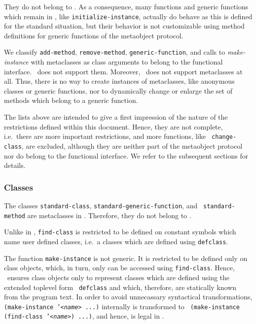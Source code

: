 They do not belong to . 
As a consequence, many functions and generic functions which remain in
, like {\tt initialize-instance},
actually do behave as this is defined for the standard
situation, but their behavior is not customizable using method
definitions for generic functions of the metaobject protocol. 

We classify {\tt add-method}, {\tt remove-method}, {\tt generic-function}, and calls to 
{\em make-instance} with metaclasses
as class arguments to belong to the functional interface. \ does not 
support them. Moreover, \ does not support metaclasses at all.
Thus, there is no way to create instances of metaclasses, like anonymous classes or generic 
functions, nor to dynamically change or enlarge the set of methods which 
belong to a generic function.

The lists above are intended to give a first impression of the 
nature of 
the restrictions defined within this document. Hence, they are not complete, 
i.e.\ there are more important restrictions, and more functions, like {\tt 
change-class}, are excluded, although they are neither part of the metaobject 
protocol nor do belong to the functional interface.
We refer to the subsequent sections for details.

\subsubsection{Classes}
\label{classes}

The classes {\tt standard-class}, {\tt standard-generic-function}, and {\tt 
standard-method} are metaclasses in \CLOS. Therefore, they do not belong to . 

Unlike in \CLOS, {\tt find-class} is restricted to be defined on constant
symbols which name user defined classes, i.e.\ a classes which are defined 
using {\tt defclass}.

The function {\tt make-instance} is not generic. It is restricted to be 
defined only on class objects, which, in turn, only can be accessed using 
{\tt find-class}. Hence, \ ensures class objects only to represent 
classes which are defined using the extended toplevel form {\tt 
defclass} and which, therefore, are statically known from the program text. 
In order to avoid unnecassary syntactical transformations, {\tt 
(make-instance '<{\it name}\/> ...)} internally is transformed to {\tt 
(make-instance (find-class '<{\it name}\/>) ...)}, and hence, is legal in 
.

